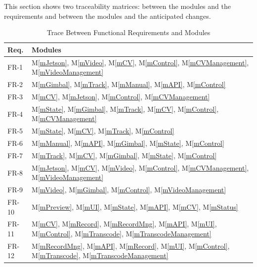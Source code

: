 \documentclass[12pt, titlepage]{article}
\newcommand{\mref}[1]{M\ref{#1}}
\begin{document}
This section shows two traceability matrices: between the modules and the
requirements and between the modules and the anticipated changes.


\begin{table}[H]
  \centering
  \begin{tabular}{p{} p{}}
    \toprule
    \textbf{Req.} & \textbf{Modules}                                                                                                                        \\
    \midrule
    FR-1          & \mref{mJetson}, \mref{mVideo}, \mref{mCV}, \mref{mControl}, \mref{mCVManagement}, \mref{mVideoManagement}                               \\
    FR-2          & \mref{mGimbal}, \mref{mTrack}, \mref{mManual}, \mref{mAPI}, \mref{mControl}                                                             \\
    FR-3          & \mref{mCV}, \mref{mJetson}, \mref{mControl}, \mref{mCVManagement}                                                                       \\
    FR-4          & \mref{mState}, \mref{mGimbal}, \mref{mTrack}, \mref{mCV}, \mref{mControl}, \mref{mCVManagement}                                         \\
    FR-5          & \mref{mState}, \mref{mCV}, \mref{mTrack}, \mref{mControl}                                                                               \\
    FR-6          & \mref{mManual}, \mref{mAPI}, \mref{mGimbal}, \mref{mState}, \mref{mControl}                                                             \\
    FR-7          & \mref{mTrack}, \mref{mCV}, \mref{mGimbal}, \mref{mState}, \mref{mControl}                                                               \\
    FR-8          & \mref{mJetson}, \mref{mCV}, \mref{mVideo}, \mref{mControl}, \mref{mCVManagement}, \mref{mVideoManagement}                               \\
    FR-9          & \mref{mVideo}, \mref{mGimbal}, \mref{mControl}, \mref{mVideoManagement}                                                                 \\
    FR-10         & \mref{mPreview}, \mref{mUI}, \mref{mState}, \mref{mAPI}, \mref{mCV}, \mref{mStatus}                                                     \\
    FR-11         & \mref{mCV}, \mref{mRecord}, \mref{mRecordMng}, \mref{mAPI}, \mref{mUI}, \mref{mControl}, \mref{mTranscode}, \mref{mTranscodeManagement} \\
    FR-12         & \mref{mRecordMng}, \mref{mAPI}, \mref{mRecord}, \mref{mUI}, \mref{mControl}, \mref{mTranscode}, \mref{mTranscodeManagement}             \\
    \bottomrule
  \end{tabular}
  \caption{Trace Between Functional Requirements and Modules}
  \label{TblRT}
\end{table}
\end{document}
